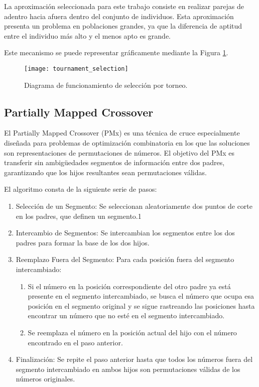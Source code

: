 La aproximación seleccionada para este trabajo consiste en realizar parejas de adentro hacia afuera dentro del conjunto de individuos. Esta aproximación presenta un problema en poblaciones grandes, ya que la diferencia de aptitud entre el individuo más alto y el menos apto es grande.

Este mecanismo se puede representar gráficamente mediante la Figura \ref{fig:TS}.

\begin{figure}[htbp]
	\centering
	\texttt{[image: tournament\_selection]}
	\caption{Diagrama de funcionamiento de selección por torneo.}
	\label{fig:TS}
\end{figure}


\subsection{Partially Mapped Crossover}
El Partially Mapped Crossover (PMx) es una técnica de cruce especialmente diseñada para problemas de optimización combinatoria en los que las soluciones son representaciones de permutaciones de números. El objetivo del PMx es transferir sin ambigüedades segmentos de información entre dos padres, garantizando que los hijos resultantes sean permutaciones válidas.

El algoritmo consta de la siguiente serie de pasos:

\begin{enumerate}
	\item Selección de un Segmento: Se seleccionan aleatoriamente dos puntos de corte en los padres, que definen un segmento.1
	\item Intercambio de Segmentos: Se intercambian los segmentos entre los dos padres para formar la base de los dos hijos.
	\item Reemplazo Fuera del Segmento: Para cada posición fuera del segmento intercambiado:
	\begin{enumerate}
		\item Si el número en la posición correspondiente del otro padre ya está presente en el segmento intercambiado, se busca el número que ocupa esa posición en el segmento original y se sigue rastreando las posiciones hasta encontrar un número que no esté en el segmento intercambiado.
		\item Se reemplaza el número en la posición actual del hijo con el número encontrado en el paso anterior.
	\end{enumerate}
	\item Finalización: Se repite el paso anterior hasta que todos los números fuera del segmento intercambiado en ambos hijos son permutaciones válidas de los números originales.
\end{enumerate}

